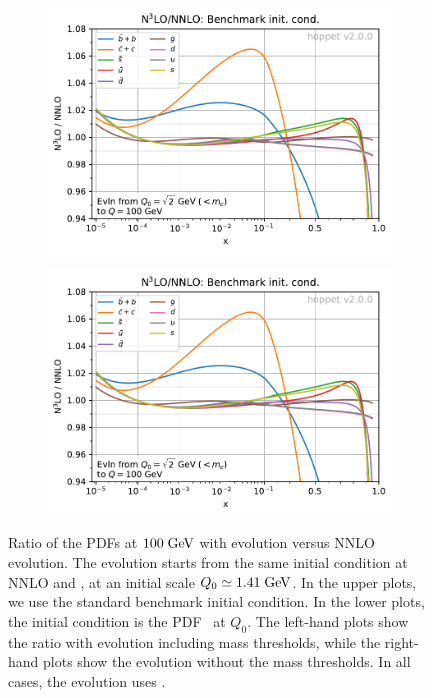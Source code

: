 \begin{figure}[p]
\begin{subfigure}{0.49\textwidth}
    \centering
    \includegraphics[width=\textwidth,page=4]{figs-v2/n3lo_k_factors.pdf}\\[-1.5ex]
    \caption{}
    \label{fig:n3lok-nnpdf40-mtm}
  \end{subfigure}
  \begin{subfigure}{0.49\textwidth}
    \centering
    \includegraphics[width=\textwidth,page=6]{figs-v2/n3lo_k_factors.pdf}\\[-1.5ex]
    \caption{}
    \label{fig:n3lok-nnpdf40-nomtm}
  \end{subfigure}
  \caption{Ratio of the PDFs at $100\;\mathrm{GeV}$ with \ntlo evolution versus
    NNLO evolution.
    The evolution starts from the same initial condition
    at NNLO and \ntlo, at an initial scale
    $Q_0\simeq 1.41\;\mathrm{GeV}$.
    In the upper plots, we use the standard benchmark initial
    condition.
    In the lower plots, the initial condition is the
     PDF~\cite{NNPDF:2021njg} at $Q_0$.
    The left-hand plots show the ratio with \ntlo evolution
    including \ntlo mass thresholds, while the right-hand plots show
    the evolution without the \ntlo mass thresholds.
    In all cases, the \ntlo evolution uses
    .  }
  \label{fig:n3lo-v-nnlo-ev}
\end{figure}

